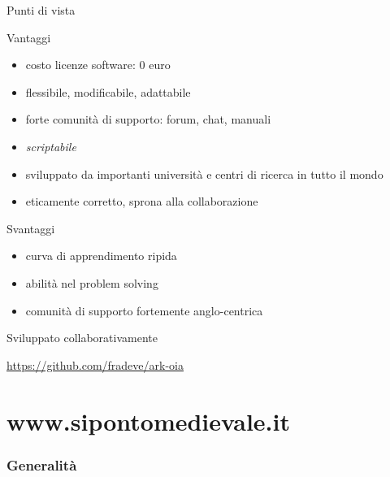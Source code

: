 \documentclass{beamer}
\begin{document}
		\begin{frame}{Punti di vista}
			\begin{block}{Vantaggi}
				\begin{itemize}
					\item costo licenze software: 0 euro
					\item flessibile, modificabile, adattabile
					\item forte comunità di supporto: forum, chat, manuali
					\item \emph{scriptabile}
					\item sviluppato da importanti università e centri di ricerca in tutto il mondo
					\item eticamente corretto, sprona alla collaborazione
				\end{itemize}
			\end{block}
			\begin{block}{Svantaggi}
				\begin{itemize}
					\item curva di apprendimento ripida
					\item abilità nel problem solving
					\item comunità di supporto fortemente anglo-centrica
				\end{itemize}
			\end{block}
		\end{frame}

		\begin{frame}{Sviluppato collaborativamente}
			\begin{center}
				\url{https://github.com/fradeve/ark-oia}
			\end{center}
		\end{frame}

\part{www.sipontomedievale.it}
\frame{\partpage}

	\section{Generalità}
\end{document}
